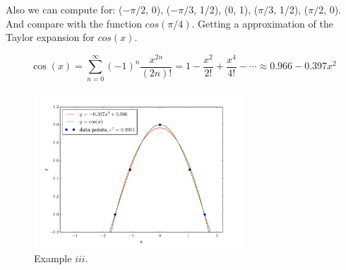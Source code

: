 Also we can compute for: ($-\pi/2$, 0), ($-\pi/3$, 1/2), (0, 1), ($\pi/3$, 1/2), ($\pi/2$, 0). And
compare with the function $cos(\pi/4)$. Getting a approximation of the Taylor
expansion for $cos(x)$.

$$
\cos(x) = \sum_{n=0}^{\infty}(-1)^{n}\frac{x^{2n}}{(2n)!} =
1 - \frac{x^2}{2!} + \frac{x^4}{4!} - \cdots \approx
0.966 - 0.397x^2
$$

\begin{figure}[h]
    \centering
    \includegraphics[width=0.70\textwidth]{./img/pi}
    \caption{Example $iii$.}
\end{figure}

